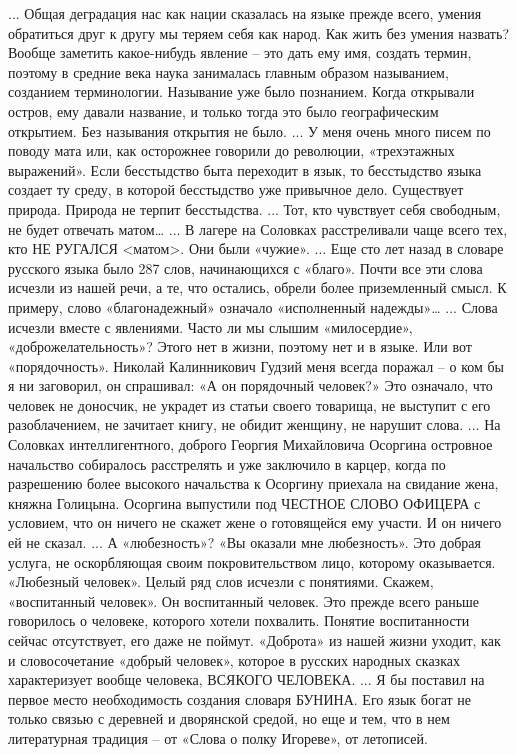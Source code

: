... Общая деградация нас как нации сказалась на языке прежде всего, умения обратиться друг к другу мы теряем себя как народ. Как жить без умения назвать? Вообще заметить какое-нибудь явление – это дать ему имя, создать термин, поэтому в средние века наука занималась главным образом называнием, созданием терминологии. Называние уже было познанием. Когда открывали остров, ему давали название, и только тогда это было географическим открытием. Без называния открытия не было.
... У меня очень много писем по поводу мата или, как осторожнее говорили до революции, «трехэтажных выражений». Если бесстыдство быта переходит в язык, то бесстыдство языка создает ту среду, в которой бесстыдство уже привычное дело. Существует природа. Природа не терпит бесстыдства.
... Тот, кто чувствует себя свободным, не будет отвечать матом…
... В лагере на Соловках расстреливали чаще всего тех, кто НЕ РУГАЛСЯ <матом>. Они были «чужие».
... Еще сто лет назад в словаре русского языка было 287 слов, начинающихся с «благо». Почти все эти слова исчезли из нашей речи, а те, что остались, обрели более приземленный смысл. К примеру, слово «благонадежный» означало «исполненный надежды»…
... Слова исчезли вместе с явлениями. Часто ли мы слышим «милосердие», «доброжелательность»? Этого нет в жизни, поэтому нет и в языке. Или вот «порядочность». Николай Калинникович Гудзий меня всегда поражал – о ком бы я ни заговорил, он спрашивал: «А он порядочный человек?» Это означало, что человек не доносчик, не украдет из статьи своего товарища, не выступит с его разоблачением, не зачитает книгу, не обидит женщину, не нарушит слова.
... На Соловках интеллигентного, доброго Георгия Михайловича Осоргина островное начальство собиралось расстрелять и уже заключило в карцер, когда по разрешению более высокого начальства к Осоргину приехала на свидание жена, княжна Голицына. Осоргина выпустили под ЧЕСТНОЕ СЛОВО ОФИЦЕРА с условием, что он ничего не скажет жене о готовящейся ему участи. И он ничего ей не сказал.
... А «любезность»? «Вы оказали мне любезность». Это добрая услуга, не оскорбляющая своим покровительством лицо, которому оказывается. «Любезный человек». Целый ряд слов исчезли с понятиями. Скажем, «воспитанный человек». Он воспитанный человек. Это прежде всего раньше говорилось о человеке, которого хотели похвалить. Понятие воспитанности сейчас отсутствует, его даже не поймут. «Доброта» из нашей жизни уходит, как и словосочетание «добрый человек», которое в русских народных сказках характеризует вообще человека, ВСЯКОГО ЧЕЛОВЕКА.
... Я бы поставил на первое место необходимость создания словаря БУНИНА. Его язык богат не только связью с деревней и дворянской средой, но еще и тем, что в нем литературная традиция – от «Слова о полку Игореве», от летописей.
